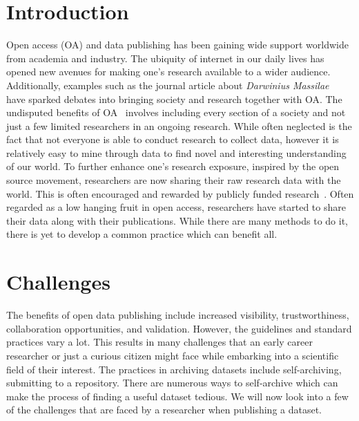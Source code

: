 \documentclass[12pt]{elsarticle}
\begin{document}
\section*{Introduction}
Open access (OA) and data publishing has been gaining wide support worldwide from academia and industry. 
The ubiquity of internet in our daily lives has opened new avenues for making one's research available to a wider audience. 
Additionally, examples such as the journal article about \textit{Darwinius Massilae}~\cite{franzen2009complete} have sparked debates into bringing society and research together with OA. 
The undisputed benefits of OA~\cite{eysenbach2006citation, willinsky2006access} involves including every section of a society and not just a few limited researchers in an ongoing research. 
While often neglected is the fact that not everyone is able to conduct research to collect data, however it is relatively easy to mine through data to find novel and interesting understanding of our world. 
To further enhance one's research exposure, inspired by the open source movement, researchers are now sharing their raw research data with the world. 
This is often encouraged and rewarded by publicly funded research~\cite{openaccessEU,openaccessrcn}. 
Often regarded as a low hanging fruit in open access, researchers have started to share their data along with their publications. 
While there are many methods to do it, there is yet to develop a common practice which can benefit all. 
\section*{Challenges}
The benefits of open data publishing include increased visibility, trustworthiness, collaboration opportunities, and validation. 
However, the guidelines and standard practices vary a lot. 
This results in many challenges that an early career researcher or just a curious citizen might face while embarking into a scientific field of their interest. 
The practices in archiving datasets include self-archiving, submitting to a repository. 
There are numerous ways to self-archive which can make the process of finding a useful dataset tedious. 
We will now look into a few of the challenges that are faced by a researcher when publishing a dataset. 
\end{document}
